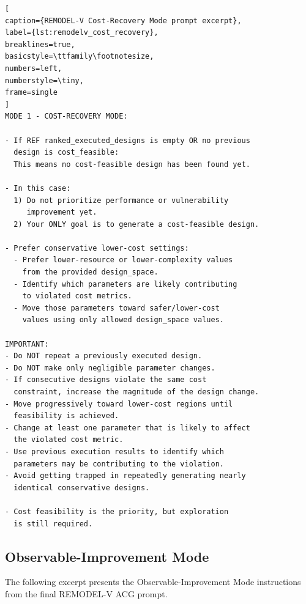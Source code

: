 \begin{lstlisting}[
caption={REMODEL-V Cost-Recovery Mode prompt excerpt},
label={lst:remodelv_cost_recovery},
breaklines=true,
basicstyle=\ttfamily\footnotesize,
numbers=left,
numberstyle=\tiny,
frame=single
]
MODE 1 - COST-RECOVERY MODE:

- If REF ranked_executed_designs is empty OR no previous
  design is cost_feasible:
  This means no cost-feasible design has been found yet.

- In this case:
  1) Do not prioritize performance or vulnerability
     improvement yet.
  2) Your ONLY goal is to generate a cost-feasible design.

- Prefer conservative lower-cost settings:
  - Prefer lower-resource or lower-complexity values
    from the provided design_space.
  - Identify which parameters are likely contributing
    to violated cost metrics.
  - Move those parameters toward safer/lower-cost
    values using only allowed design_space values.

IMPORTANT:
- Do NOT repeat a previously executed design.
- Do NOT make only negligible parameter changes.
- If consecutive designs violate the same cost
  constraint, increase the magnitude of the design change.
- Move progressively toward lower-cost regions until
  feasibility is achieved.
- Change at least one parameter that is likely to affect
  the violated cost metric.
- Use previous execution results to identify which
  parameters may be contributing to the violation.
- Avoid getting trapped in repeatedly generating nearly
  identical conservative designs.

- Cost feasibility is the priority, but exploration
  is still required.
\end{lstlisting}


\subsection{Observable-Improvement Mode}
\label{app:remodelv_prompts_mode2}


The following excerpt presents the
Observable-Improvement Mode instructions from
the final REMODEL-V ACG prompt.

